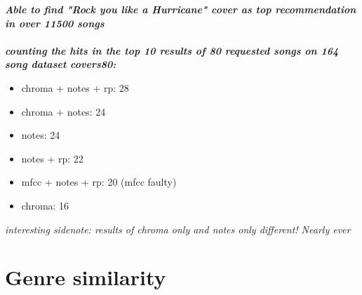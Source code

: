 \textit{\textbf{Able to find "Rock you like a Hurricane" cover as top recommendation in over 11500 songs\\}}
\ \\
\textit{\textbf{counting the hits in the top 10 results of 80 requested songs on 164 song dataset covers80:\\}}
\begin{itemize}
	\setlength\itemsep{-0.5em}
	\item chroma + notes + rp: 28
	\item chroma + notes: 24
	\item notes: 24
	\item notes + rp: 22
	\item mfcc + notes + rp: 20 (mfcc faulty)
	\item chroma: 16

\end{itemize}
\textit{interesting sidenote: results of chroma only and notes only different! Nearly ever}

\section{Genre similarity}


